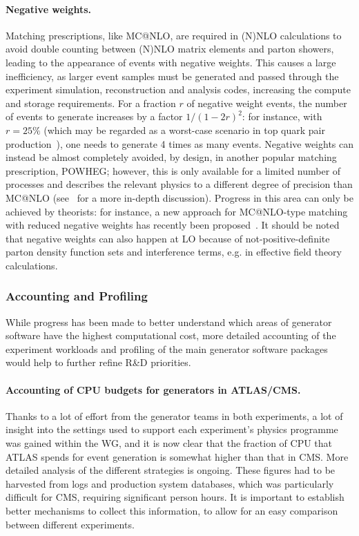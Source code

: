 \paragraph{Negative weights.} Matching prescriptions, like MC@NLO, are required
in (N)NLO calculations to avoid double counting between (N)NLO matrix
elements and parton showers, leading to the appearance of events with
negative weights. This causes a large inefficiency, as larger event
samples must be generated and passed through the experiment simulation,
reconstruction and analysis codes, increasing the compute and storage
requirements. For a fraction $r$ of negative weight events, the number of
events to generate increases by a factor $1/(1-2r)^2$: for instance,
with $r=25\%$ (which may be regarded as a worst-case scenario in top quark
pair production~\cite{Fre20}), one needs to generate 4 times as many
events. Negative weights can instead be almost completely avoided, by
design, in another popular matching prescription, POWHEG; however, this
is only available for a limited number of processes and describes the
relevant physics to a different degree of precision than MC@NLO 
(see~\cite{Fre20} for a more in-depth discussion). Progress in this area can
only be achieved by theorists: for instance, a new approach for
MC@NLO-type matching with reduced negative weights has recently been
proposed~\cite{Fre20}. It should be noted that negative weights can also
happen at LO because of not-positive-definite parton density function
sets and interference terms, e.g. in effective field theory
calculations.

\subsubsection{Accounting and Profiling}

While progress has been made to better understand which areas of
generator software have the highest computational cost, more detailed
accounting of the experiment workloads and profiling of the main
generator software packages would help to further refine R\&D
priorities.

\paragraph{Accounting of CPU budgets for generators in ATLAS/CMS.} Thanks to a
lot of effort from the generator teams in both experiments, a lot of
insight into the settings used to support each experiment's physics
programme was gained within the WG, and it is now clear that the
fraction of CPU that ATLAS spends for event generation is somewhat
higher than that in CMS. More detailed analysis of the different
strategies is ongoing. These figures had to be
harvested from logs and production system databases, which was
particularly difficult for CMS, requiring significant person hours.
It is important to establish better
mechanisms to collect this information, to allow for an easy comparison
between different experiments.

